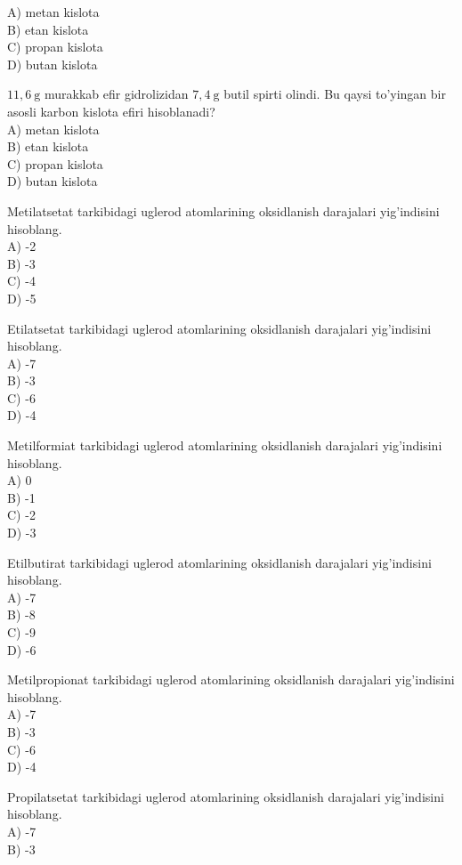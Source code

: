 A) metan kislota\\
B) etan kislota\\
C) propan kislota\\
D) butan kislota
  \item $11,6 \mathrm{~g}$ murakkab efir gidrolizidan $7,4 \mathrm{~g}$ butil spirti olindi. Bu qaysi to'yingan bir asosli karbon kislota efiri hisoblanadi?\\
A) metan kislota\\
B) etan kislota\\
C) propan kislota\\
D) butan kislota
  \item Metilatsetat tarkibidagi uglerod atomlarining oksidlanish darajalari yig'indisini hisoblang.\\
A) -2\\
B) -3\\
C) -4\\
D) -5\\
  \item Etilatsetat tarkibidagi uglerod atomlarining oksidlanish darajalari yig'indisini hisoblang.\\
A) -7\\
B) -3\\
C) -6\\
D) -4
  \item Metilformiat tarkibidagi uglerod atomlarining oksidlanish darajalari yig'indisini hisoblang.\\
A) 0\\
B) -1\\
C) -2\\
D) -3
  \item Etilbutirat tarkibidagi uglerod atomlarining oksidlanish darajalari yig'indisini hisoblang.\\
A) -7\\
B) -8\\
C) -9\\
D) -6
  \item Metilpropionat tarkibidagi uglerod atomlarining oksidlanish darajalari yig'indisini hisoblang.\\
A) -7\\
B) -3\\
C) -6\\
D) -4
  \item Propilatsetat tarkibidagi uglerod atomlarining oksidlanish darajalari yig'indisini hisoblang.\\
A) -7\\
B) -3\\
